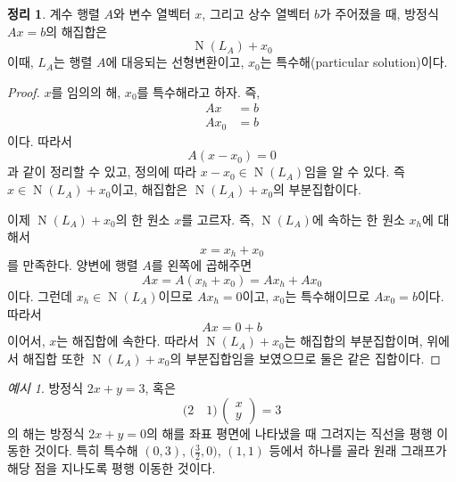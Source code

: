 \documentclass[unfonts,oneside,a4paper]{oblivoir}
\theoremstyle{definition}
\theoremstyle{theorem}
\newtheorem{theorem}[definition]{정리}
\theoremstyle{theorem}
\theoremstyle{remark}
\theoremstyle{remark}
\theoremstyle{remark}
\newtheorem*{example}{예시}
\theoremstyle{remark}
\renewcommand{\vec}[1]{\bm{\mathit{#1}}}
\newcommand{\vecz}{\bm{\mathrm{0}}}
\DeclareMathOperator{\Null}{N}
\begin{document}
\begin{theorem} \label{thm:nonhomogeneous}
    계수 행렬 $A$와 변수 열벡터 $\vec x$, 그리고 상수 열벡터 $\vec b$가 주어졌을 때, 방정식 $A \vec x = \vec b$의 해집합은
    \begin{equation*}
        \Null(L_A) + \vec x_0
    \end{equation*}
    이때, $L_A$는 행렬 $A$에 대응되는 선형변환이고, $\vec x_0$는 특수해(particular solution)이다.
\end{theorem}
\begin{proof}
    $\vec x$를 임의의 해, $\vec x_0$를 특수해라고 하자.
    즉,
    \begin{align*}
        A\vec x &= \vec b\\
        A\vec x_0 &= \vec b
    \end{align*}
    이다.
    따라서
    \begin{equation*}
        A(\vec x - \vec x_0) = 0
    \end{equation*}
    과 같이 정리할 수 있고, 정의에 따라 $\vec x - \vec x_0 \in \Null(L_A)$임을 알 수 있다.
    즉 $\vec x \in \Null(L_A) + \vec x_0$이고, 해집합은 $\Null(L_A) + \vec x_0$의 부분집합이다.

    이제 $\Null(L_A) + \vec x_0$의 한 원소 $\vec x$를 고르자.
    즉, $\Null(L_A)$에 속하는 한 원소 $\vec x_h$에 대해서
    \begin{equation*}
        \vec x = \vec x_h + \vec x_0
    \end{equation*}
    를 만족한다.
    양변에 행렬 $A$를 왼쪽에 곱해주면
    \begin{equation*}
        A \vec x = A (\vec x_h + \vec x_0) = A \vec x_h + A \vec x_0
    \end{equation*}
    이다.
    그런데 $\vec x_h \in \Null(L_A)$이므로 $A \vec x_h = \vecz$이고, $\vec x_0$는 특수해이므로 $A \vec x_0 = \vec b$이다.
    따라서
    \begin{equation*}
        A \vec x = \vecz + \vec b
    \end{equation*}
    이어서, $\vec x$는 해집합에 속한다.
    따라서 $\Null(L_A) + \vec x_0$는 해집합의 부분집합이며, 위에서 해집합 또한 $\Null(L_A) + \vec x_0$의 부분집합임을 보였으므로 둘은 같은 집합이다.
\end{proof}

\begin{example}
    방정식 $2x + y = 3$, 혹은
    \begin{equation*}
        \bigl(2 \quad 1\bigr)\,
        \begin{pmatrix}
            x\\
            y
        \end{pmatrix}
        = 3
    \end{equation*}
    의 해는 방정식 $2x + y = 0$의 해를 좌표 평면에 나타냈을 때 그려지는 직선을 평행 이동한 것이다.
    특히 특수해 $(0, 3)$, $\bigl(\frac 32, 0\bigr)$, $(1, 1)$ 등에서 하나를 골라 원래 그래프가 해당 점을 지나도록 평행 이동한 것이다.
\end{example}
\end{document}
